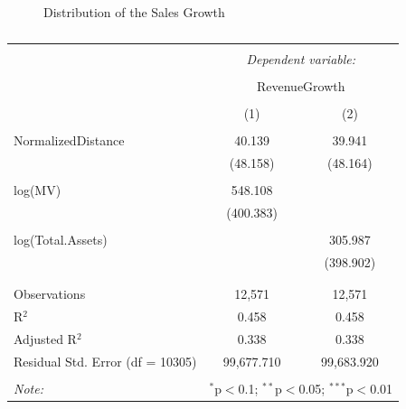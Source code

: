 \documentclass[
]{article}
\begin{document}
\begin{figure}


\caption{\label{fig-3}Distribution of the Sales Growth}

\end{figure}%

\begin{table}[!htbp] \centering 
  \caption{} 
  \label{} 
\begin{tabular}{@{\extracolsep{5pt}}lcc} 
\\[-1.8ex]\hline 
\hline \\[-1.8ex] 
 & \multicolumn{2}{c}{\textit{Dependent variable:}} \\ 
\cline{2-3} 
\\[-1.8ex] & \multicolumn{2}{c}{RevenueGrowth} \\ 
\\[-1.8ex] & (1) & (2)\\ 
\hline \\[-1.8ex] 
 NormalizedDistance & 40.139 & 39.941 \\ 
  & (48.158) & (48.164) \\ 
  & & \\ 
 log(MV) & 548.108 &  \\ 
  & (400.383) &  \\ 
  & & \\ 
 log(Total.Assets) &  & 305.987 \\ 
  &  & (398.902) \\ 
  & & \\ 
\hline \\[-1.8ex] 
Observations & 12,571 & 12,571 \\ 
R$^{2}$ & 0.458 & 0.458 \\ 
Adjusted R$^{2}$ & 0.338 & 0.338 \\ 
Residual Std. Error (df = 10305) & 99,677.710 & 99,683.920 \\ 
\hline 
\hline \\[-1.8ex] 
\textit{Note:}  & \multicolumn{2}{r}{$^{*}$p$<$0.1; $^{**}$p$<$0.05; $^{***}$p$<$0.01} \\ 
\end{tabular} 
\end{table}
\end{document}
